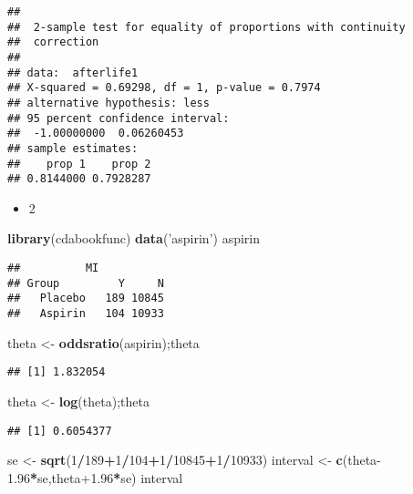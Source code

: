 \documentclass[12pt,hyperref,]{ctexart}
\newenvironment{Shaded}{\begin{snugshade}}{\end{snugshade}}
\newcommand{\DecValTok}[1]{\textcolor[rgb]{0.00,0.00,0.81}{#1}}
\newcommand{\FloatTok}[1]{\textcolor[rgb]{0.00,0.00,0.81}{#1}}
\newcommand{\KeywordTok}[1]{\textcolor[rgb]{0.13,0.29,0.53}{\textbf{#1}}}
\newcommand{\NormalTok}[1]{#1}
\newcommand{\OperatorTok}[1]{\textcolor[rgb]{0.81,0.36,0.00}{\textbf{#1}}}
\newcommand{\StringTok}[1]{\textcolor[rgb]{0.31,0.60,0.02}{#1}}
\providecommand{\tightlist}{%
  \setlength{\itemsep}{0pt}\setlength{\parskip}{0pt}}
\begin{document}
\begin{verbatim}
## 
##  2-sample test for equality of proportions with continuity
##  correction
## 
## data:  afterlife1
## X-squared = 0.69298, df = 1, p-value = 0.7974
## alternative hypothesis: less
## 95 percent confidence interval:
##  -1.00000000  0.06260453
## sample estimates:
##    prop 1    prop 2 
## 0.8144000 0.7928287
\end{verbatim}

\begin{itemize}
\tightlist
\item
  2
\end{itemize}

\begin{Shaded}
\begin{Highlighting}[]
\KeywordTok{library}\NormalTok{(cdabookfunc)}
\KeywordTok{data}\NormalTok{(}\StringTok{'aspirin'}\NormalTok{)}
\NormalTok{aspirin}
\end{Highlighting}
\end{Shaded}

\begin{verbatim}
##          MI
## Group         Y     N
##   Placebo   189 10845
##   Aspirin   104 10933
\end{verbatim}

\begin{Shaded}
\begin{Highlighting}[]
\NormalTok{theta <-}\StringTok{ }\KeywordTok{oddsratio}\NormalTok{(aspirin);theta}
\end{Highlighting}
\end{Shaded}

\begin{verbatim}
## [1] 1.832054
\end{verbatim}

\begin{Shaded}
\begin{Highlighting}[]
\NormalTok{theta <-}\StringTok{ }\KeywordTok{log}\NormalTok{(theta);theta}
\end{Highlighting}
\end{Shaded}

\begin{verbatim}
## [1] 0.6054377
\end{verbatim}

\begin{Shaded}
\begin{Highlighting}[]
\NormalTok{se <-}\StringTok{ }\KeywordTok{sqrt}\NormalTok{(}\DecValTok{1}\OperatorTok{/}\DecValTok{189}\OperatorTok{+}\DecValTok{1}\OperatorTok{/}\DecValTok{104}\OperatorTok{+}\DecValTok{1}\OperatorTok{/}\DecValTok{10845}\OperatorTok{+}\DecValTok{1}\OperatorTok{/}\DecValTok{10933}\NormalTok{)}
\NormalTok{interval <-}\StringTok{ }\KeywordTok{c}\NormalTok{(theta}\FloatTok{-1.96}\OperatorTok{*}\NormalTok{se,theta}\FloatTok{+1.96}\OperatorTok{*}\NormalTok{se)}
\NormalTok{interval}
\end{Highlighting}
\end{Shaded}
\end{document}
